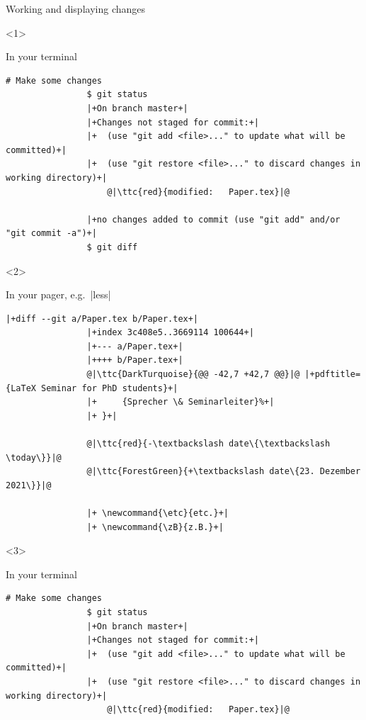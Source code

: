 \documentclass[usenames,svgnames,14pt]{beamer}
\newcommand{\ttc}[2]{\texttt{\textcolor{#1}{#2}}}
\begin{document}
\begin{frame}[fragile]{Working and displaying changes}
    \vspace{-0.0\textheight}
    \begin{overlayarea}{\textwidth}{0.7\textheight}
        \begin{onlyenv}<1>
            \centerline{In your terminal}
            \begin{lstlisting}[style=MyBash, aboveskip=2mm, xleftmargin=-6mm, xrightmargin=-6mm]
                # Make some changes
                $ git status
                |+On branch master+|
                |+Changes not staged for commit:+|
                |+  (use "git add <file>..." to update what will be committed)+|
                |+  (use "git restore <file>..." to discard changes in working directory)+|
                    @|\ttc{red}{modified:   Paper.tex}|@

                |+no changes added to commit (use "git add" and/or "git commit -a")+|
                $ git diff
            \end{lstlisting}
        \end{onlyenv}
        \begin{onlyenv}<2>
            \centerline{In your pager, e.g.\ \bash|less|}
            \begin{lstlisting}[style=MyBash, aboveskip=2mm]
                |+diff --git a/Paper.tex b/Paper.tex+|
                |+index 3c408e5..3669114 100644+|
                |+--- a/Paper.tex+|
                |++++ b/Paper.tex+|
                @|\ttc{DarkTurquoise}{@@ -42,7 +42,7 @@}|@ |+pdftitle={LaTeX Seminar for PhD students}+|
                |+     {Sprecher \& Seminarleiter}%+|
                |+ }+|

                @|\ttc{red}{-\textbackslash date\{\textbackslash \today\}}|@
                @|\ttc{ForestGreen}{+\textbackslash date\{23. Dezember 2021\}}|@

                |+ \newcommand{\etc}{etc.}+|
                |+ \newcommand{\zB}{z.B.}+|
            \end{lstlisting}
        \end{onlyenv}
        \begin{onlyenv}<3>
            \centerline{In your terminal}
            \begin{lstlisting}[style=MyBash, aboveskip=2mm, xleftmargin=-6mm, xrightmargin=-6mm]
                # Make some changes
                $ git status
                |+On branch master+|
                |+Changes not staged for commit:+|
                |+  (use "git add <file>..." to update what will be committed)+|
                |+  (use "git restore <file>..." to discard changes in working directory)+|
                    @|\ttc{red}{modified:   Paper.tex}|@


\end{lstlisting}
\end{onlyenv}
\end{overlayarea}
\end{frame}
\end{document}
